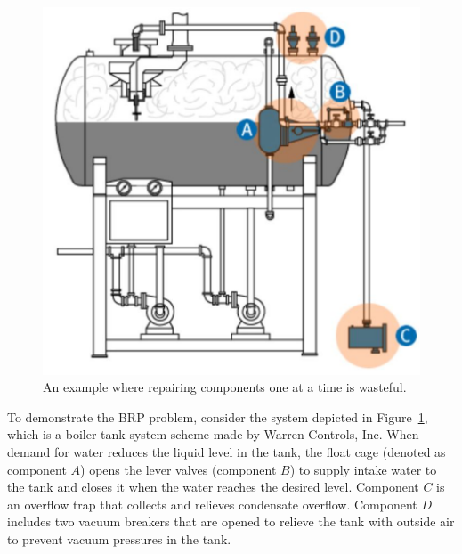 \documentclass[review]{elsarticle}
\newcommand\roni[1]{\textcolor{green}{roni: #1}}
\begin{document}




\begin{figure}{}%
\begin{center}
  \includegraphics[width=0.5\columnwidth]{system_example.pdf}
  \caption{An example where repairing components one at a time is wasteful.}
  \label{fig:simple-example}
\end{center}
\end{figure}

To demonstrate the BRP problem, consider the system depicted in Figure~\ref{fig:simple-example}, which is a boiler tank system scheme made by Warren Controls, Inc. %
When demand for water reduces the liquid level in the tank, the float cage (denoted as component $A$) opens the lever valves (component $B$) to supply intake water to the tank and closes it when the water reaches the desired level. Component $C$ is an overflow trap that collects and relieves condensate overflow. Component $D$ includes two vacuum breakers that are opened to relieve the tank with outside air to prevent vacuum pressures in the tank.
\end{document}

